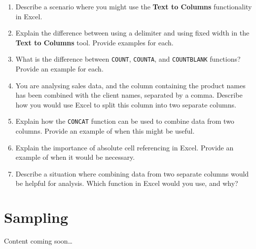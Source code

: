 \documentclass[
]{book}
\begin{document}
\begin{enumerate}
\def\labelenumi{\arabic{enumi}.}
\item
  Describe a scenario where you might use the \textbf{Text to Columns} functionality in Excel.
\item
  Explain the difference between using a delimiter and using fixed width in the \textbf{Text to Columns} tool. Provide examples for each.
\item
  What is the difference between \texttt{COUNT}, \texttt{COUNTA}, and \texttt{COUNTBLANK} functions? Provide an example for each.
\item
  You are analysing sales data, and the column containing the product names has been combined with the client names, separated by a comma. Describe how you would use Excel to split this column into two separate columns.
\item
  Explain how the \texttt{CONCAT} function can be used to combine data from two columns. Provide an example of when this might be useful.
\item
  Explain the importance of absolute cell referencing in Excel. Provide an example of when it would be necessary.
\item
  Describe a situation where combining data from two separate columns would be helpful for analysis. Which function in Excel would you use, and why?
\end{enumerate}

\chapter{Sampling}\label{ch4}

Content coming soon\ldots{}

  
\end{document}
